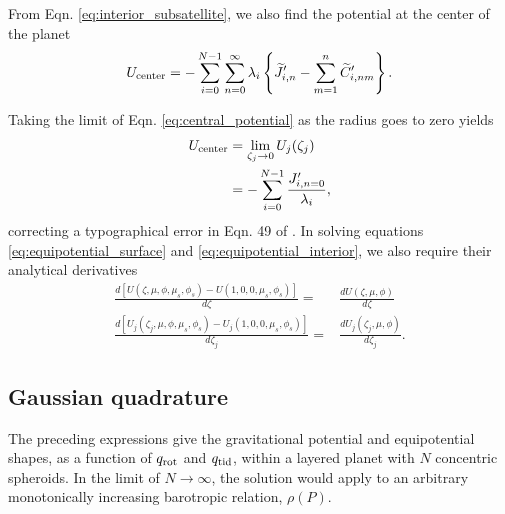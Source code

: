 %
From Eqn. \eqref{eq:interior_subsatellite}, we also find the potential at the center
of the planet
%
\begin{equation} \begin{aligned} U_{\rm center} = -\sum_{i=0}^{N-1} \sum_{n=0}^\infty
        \lambda_i \left\{ \widetilde{J}'_{i,n} - \sum_{m=1}^{n} \widetilde{C}'_{i,nm} \right\}.
    \end{aligned} \label{eq:central_potential} \end{equation}

%
Taking the limit of Eqn. \eqref{eq:central_potential} as the radius goes to zero
yields
%
\begin{equation} \begin{aligned} U_{\rm center} &=\lim_{\zeta_j\to 0} U_j(\zeta_j)\\
        &= - \sum_{i=0}^{N-1} \frac{J'_{i,n=0}}{ \lambda_i}, \end{aligned}
\end{equation} correcting a typographical error in Eqn. 49 of \citet{hubbard2013}.
%
In solving equations \eqref{eq:equipotential_surface} and
\eqref{eq:equipotential_interior}, we also require their analytical derivatives
%
\begin{equation} \begin{aligned} \frac{d \left[U(\zeta,\mu,\phi,\mu_s,\phi_s) -
        U(1,0,0,\mu_s,\phi_s) \right] }{d\zeta} =& \frac{dU(\zeta,\mu,\phi)}{d\zeta}
        \\ \frac{d \left[ U_j(\zeta_j,\mu,\phi,\mu_s,\phi_s) -
        U_{j}(1,0,0,\mu_s,\phi_s) \right]}{d\zeta_j} =& \frac{d
        U_j(\zeta_j,\mu,\phi)}{d\zeta_j}.  \label{eq:equipotential_derivative}
    \end{aligned} \end{equation}

\subsection{Gaussian quadrature} \label{quadrature}

The preceding expressions give the gravitational potential and equipotential shapes,
as a function of $q_{\rm rot}$ and $q_{\rm tid}$, within a layered planet with $N$
concentric spheroids. In the limit of $N\to \infty$, the solution would apply to an
arbitrary monotonically increasing barotropic relation, $\rho(P)$. 


